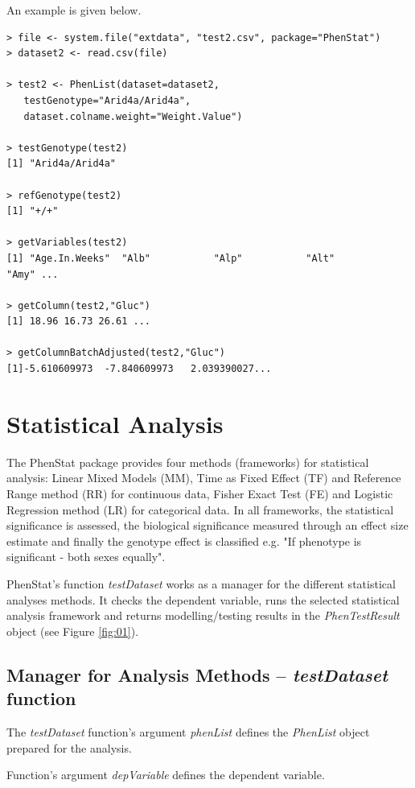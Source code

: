 \documentclass[12pt,a4paper]{article}
\begin{document}
An example is given below.


\begingroup
    \fontsize{8pt}{12pt}\selectfont
\begin{verbatim}
> file <- system.file("extdata", "test2.csv", package="PhenStat") 
> dataset2 <- read.csv(file)

> test2 <- PhenList(dataset=dataset2,
   testGenotype="Arid4a/Arid4a",
   dataset.colname.weight="Weight.Value")

> testGenotype(test2)
[1] "Arid4a/Arid4a"

> refGenotype(test2)
[1] "+/+"

> getVariables(test2)
[1] "Age.In.Weeks"  "Alb"           "Alp"           "Alt"           "Amy" ...

> getColumn(test2,"Gluc")
[1] 18.96 16.73 26.61 ...

> getColumnBatchAdjusted(test2,"Gluc")
[1]-5.610609973  -7.840609973   2.039390027...

\end{verbatim}
\endgroup
\section{Statistical Analysis}
The PhenStat package provides four methods (frameworks) for statistical analysis: Linear Mixed Models (MM), Time as Fixed Effect (TF) and Reference Range method (RR) for continuous data, Fisher Exact Test (FE) and Logistic Regression method (LR) for categorical data. In all frameworks, 
the statistical significance is assessed, the biological significance measured through an effect size estimate and finally the genotype effect is classified e.g. "If phenotype is significant - both sexes equally".  


PhenStat's function \textit{testDataset} works as a manager for the different statistical analyses methods. It checks the dependent variable, runs the selected statistical analysis framework and
 returns modelling\slash testing results in the \textit{PhenTestResult} object (see Figure \ref{fig:01}). 

\subsection{Manager for Analysis Methods -- \textit{testDataset} function}
The \textit{testDataset} function's argument \textit{phenList} defines the \textit{PhenList} object prepared for the analysis.

Function's argument \textit{depVariable} defines the dependent variable.
\end{document}
